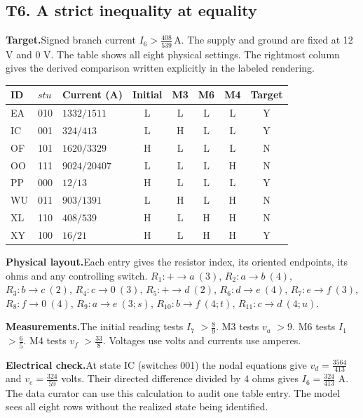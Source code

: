 \documentclass[12pt,letterpaper]{article}
\newcommand{\reading}[2]{\par\smallskip\textsf{\color{accent}\bfseries #1}\enspace #2\par}
\begin{document}
\clearpage{}\subsection*{T6. A strict inequality at equality}
\reading{Target.}{Signed branch current $I_{6}>\tfrac{408}{539}\,\mathrm{A}$. The supply and ground are fixed at 12 V and 0 V. The table shows all eight physical settings. The rightmost column gives the derived comparison written explicitly in the labeled rendering.}

\begin{center}{\small\setlength{\tabcolsep}{4pt}\begin{tabularx}{\linewidth}{@{}llYccccc@{}}\toprule
ID & $stu$ & Current (A) & Initial & M3 & M6 & M4 & Target\\ \midrule
EA & 010 & $1332/1511$ & L & L & L & L & Y\\
IC & 001 & $324/413$ & L & H & L & L & Y\\
OF & 101 & $1620/3329$ & H & L & L & L & N\\
OO & 111 & $9024/20407$ & L & L & L & H & N\\
PP & 000 & $12/13$ & H & L & L & L & Y\\
WU & 011 & $903/1391$ & L & H & L & H & N\\
XL & 110 & $408/539$ & H & L & H & H & N\\
XY & 100 & $16/21$ & H & L & H & H & Y\\ \bottomrule\end{tabularx}}
\end{center}

\reading{Physical layout.}{Each entry gives the resistor index, its oriented endpoints, its ohms and any controlling switch. $R_{1}\colon +\to a\ (3)$, $R_{2}\colon a\to b\ (4)$, $R_{3}\colon b\to c\ (2)$, $R_{4}\colon c\to 0\ (3)$, $R_{5}\colon +\to d\ (2)$, $R_{6}\colon d\to e\ (4)$, $R_{7}\colon e\to f\ (3)$, $R_{8}\colon f\to 0\ (4)$, $R_{9}\colon a\to e\ (3;s)$, $R_{10}\colon b\to f\ (4;t)$, $R_{11}\colon c\to d\ (4;u)$.}

\reading{Measurements.}{The initial reading tests $I_{7}$ $>\tfrac{8}{9}$. M3 tests $v_{a}$ $>9$. M6 tests $I_{1}$ $>\tfrac{6}{5}$. M4 tests $v_{f}$ $>\tfrac{33}{8}$. Voltages use volts and currents use amperes.}

\reading{Electrical check.}{At state IC (switches 001) the nodal equations give $v_{d}=\tfrac{3564}{413}$ and $v_{e}=\tfrac{324}{59}$ volts. Their directed difference divided by $4$ ohms gives $I_{6}=\tfrac{324}{413}$ A. The data curator can use this calculation to audit one table entry. The model sees all eight rows without the realized state being identified.}
\end{document}
